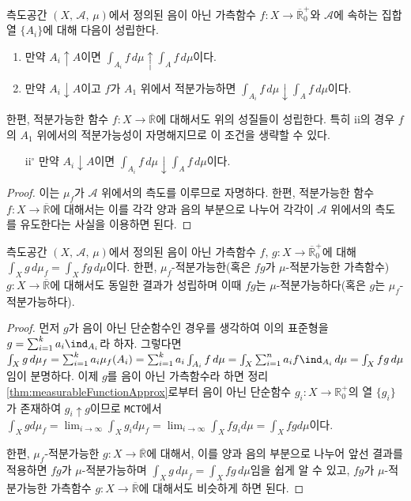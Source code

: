 \begin{theorem}\label{thm:monoSeriesIntegral}
    측도공간 $(X,\,\mathcal{A},\,\mu)$에서 정의된 음이 아닌 가측함수 $f:X\to\overline{\mathbb{R}}^+_0$와 $\mathcal{A}$에 속하는 집합열 $\{A_i\}$에 대해 다음이 성립한다.
    \begin{enumerate}
        \item 만약 $A_i\uparrow A$이면 $\int_{A_i}f\,d\mu\uparrow\int_Af\,d\mu$이다.
        \item 만약 $A_i\downarrow A$이고 $f$가 $A_1$ 위에서 적분가능하면 $\int_{A_i}f\,d\mu\downarrow\int_Af\,d\mu$이다.
    \end{enumerate}
    한편, 적분가능한 함수 $f:X\to\overline{\mathbb{R}}$에 대해서도 위의 성질들이 성립한다. 특히 ii의 경우 $f$의 $A_1$ 위에서의 적분가능성이 자명해지므로 이 조건을 생략할 수 있다.
    \begin{enumerate}
        \item[ii$^\circ$] 만약 $A_i\downarrow A$이면 $\int_{A_i}f\,d\mu\downarrow\int_Af\,d\mu$이다.
    \end{enumerate}
\end{theorem}

\begin{proof}
    이는 $\mu_f$가 $\mathcal{A}$ 위에서의 측도를 이루므로 자명하다. 한편, 적분가능한 함수 $f:X\to\overline{\mathbb{R}}$에 대해서는 이를 각각 양과 음의 부분으로 나누어 각각이 $\mathcal{A}$ 위에서의 측도를 유도한다는 사실을 이용하면 된다.
\end{proof}

\begin{theorem}\label{thm:intInducedMeasure}
    측도공간 $(X,\,\mathcal{A},\,\mu)$에서 정의된 음이 아닌 가측함수 $f,\,g:X\to\overline{\mathbb{R}}^+_0$에 대해 $\int_Xg\,d\mu_f=\int_Xfg\,d\mu$이다. 한편, $\mu_f$-적분가능한(혹은 $fg$가 $\mu$-적분가능한 가측함수) $g:X\to\overline{\mathbb{R}}$에 대해서도 동일한 결과가 성립하며 이때 $fg$는 $\mu$-적분가능하다(혹은 $g$는 $\mu_f$-적분가능하다).
\end{theorem}

\begin{proof}
    먼저 $g$가 음이 아닌 단순함수인 경우를 생각하여 이의 표준형을 $g=\sum_{i=1}^ka_i\ind_{A_i}$라 하자. 그렇다면 $\int_Xg\,d\mu_f=\sum_{i=1}^ka_i\mu_f(A_i)=\sum_{i=1}^ka_i\int_{A_i}f\,d\mu=\int_X\sum_{i=1}^na_if\ind_{A_i}\,d\mu=\int_Xfg\,d\mu$임이 분명하다. 이제 $g$를 음이 아닌 가측함수라 하면 정리 \ref{thm:measurableFunctionApprox}로부터 음이 아닌 단순함수 $g_i:X\to\mathbb{R}^+_0$의 열 $\{g_i\}$가 존재하여 $g_i\uparrow g$이므로 \texttt{MCT}에서 $\int_Xgd\mu_f=\lim_{i\to\infty}\int_Xg_id\mu_f=\lim_{i\to\infty}\int_Xfg_id\mu=\int_Xfgd\mu$이다.

    한편, $\mu_f$-적분가능한 $g:X\to\overline{\mathbb{R}}$에 대해서, 이를 양과 음의 부분으로 나누어 앞선 결과를 적용하면 $fg$가 $\mu$-적분가능하며 $\int_Xg\,d\mu_f=\int_Xfg\,d\mu$임을 쉽게 알 수 있고, $fg$가 $\mu$-적분가능한 가측함수 $g:X\to\overline{\mathbb{R}}$에 대해서도 비슷하게 하면 된다.
\end{proof}

